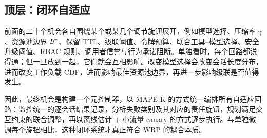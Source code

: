\subsection{顶层：闭环自适应}

\begin{opportunity}
\label{opp:self-adapt}
前面的二十个机会各自围绕某个或某几个调节旋钮展开，例如模型选择、压缩率 $\gamma$、资源池边界 $\mathcal{B}^*$、保留 TTL、级联阈值、令牌预算、联合工具--模型选择、安全升级阈值、RBAC 规则、调用者信誉与行为承诺阻断。单独看时，每个回路都说得通；但一旦放到一起，它们就会互相影响。改变模型选择会改变会话长度分布，进而改变工作负载 CDF，进而影响最佳资源池边界，再进一步影响级联是否值得发生。

因此，最终机会是构建一个元控制器，以 MAPE-K 的方式统一编排所有自适应回路：监控统一的逐会话结果记录，分析失败类别及其对应的责任旋钮，规划满足交互约束的联合调整，再以离线估计 + 小流量 canary 的方式逐步执行。与单独微调每个旋钮相比，这种闭环系统才真正符合 WRP 的耦合本质。


\end{opportunity}
